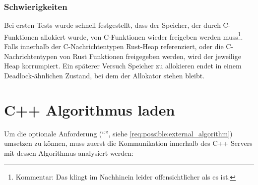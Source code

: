 \subsubsection{Schwierigkeiten}

Bei ersten Tests wurde schnell festgestellt, dass der Speicher, der durch C-Funktionen allokiert wurde, von C-Funktionen wieder freigeben werden muss\footnote{Kommentar: Das klingt im Nachhinein leider offensichtlicher als es ist.}.
Falls innerhalb der C-Nachrichtentypen Rust-Heap referenziert, oder die C-Nachrichtentypen von Rust Funktionen freigegeben werden, wird der jeweilige Heap korrumpiert.
Ein späterer Versuch Speicher zu allokieren endet in einem Deadlock-ähnlichen Zustand, bei dem der Allokator stehen bleibt.



\clearpage
\section{C++ Algorithmus laden}

Um die optionale Anforderung  (\enquote{}, siehe \autoref{req:possible:external_algorithm}) umsetzen zu können, muss zuerst die Kommunikation innerhalb des C++ Servers mit dessen Algorithmus analysiert werden:

